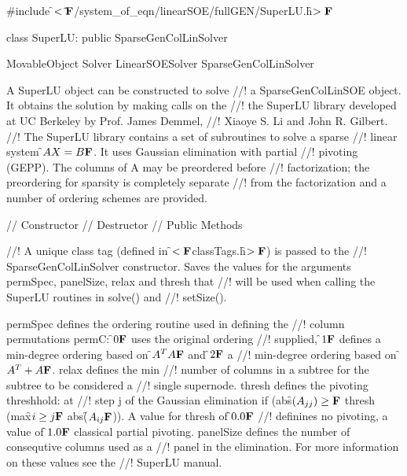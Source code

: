 
\indent \#include \f$<\tilde{
}{\bf F}$/system\_of\_eqn/linearSOE/fullGEN/SuperLU.h\f$>{\bf F}$ 

\indent class SuperLU: public SparseGenColLinSolver

\indent  MovableObject
\indent\indent  Solver
\indent\indent\indent LinearSOESolver
\indent\indent\indent\indent  SparseGenColLinSolver
\indent\indent\indent\indent{}

\indent A SuperLU object can be constructed to solve
//! a SparseGenColLinSOE object. It obtains the solution by making calls on the
//! the SuperLU library developed at UC Berkeley by Prof. James Demmel, 
//! Xiaoye S. Li and John R. Gilbert.
//! The SuperLU library contains a set of subroutines to solve a sparse
//! linear system  \f$AX=B{\bf F}$. It uses Gaussian elimination with partial
//! pivoting (GEPP). The columns of A may be preordered before
//! factorization; the preordering for sparsity is completely separate
//! from the factorization and a number of ordering schemes are provided.

\indent // Constructor
\indent // Destructor
\indent // Public Methods

//! A unique class tag (defined in \f$<{\bf F}$classTags.h\f$>{\bf F}$) is passed to the
//! SparseGenColLinSolver constructor. Saves the values for the arguments
\p permSpec, \p panelSize, \p relax and \p thresh that
//! will be used when calling the SuperLU routines in solve() and
//! setSize().

\p permSpec defines the ordering routine used in defining the
//! column permutations \p permC: \f$0{\bf F}$ uses the original ordering
//! supplied, \f$1{\bf F}$ defines a min-degree ordering based on \f$A^TA{\bf F}$ and \f$2{\bf F}$ a
//! min-degree ordering based on \f$A^T + A{\bf F}$. \p relax defines the min
//! number of columns in a subtree for the subtree to be considered a
//! single supernode. \p thresh defines the pivoting threshhold: at
//! step j of the Gaussian elimination if (abs\f$(A_{jj}) \ge{\bf F}$ \p thresh
(max\f$ i \ge j{\bf F}$ abs(\f$A_{ij}{\bf F}$)). A value for \p thresh of \f$0.0{\bf F}$
//! definines no pivoting, a value of \f$1.0{\bf F}$ classical partial pivoting.
\p panelSize defines the number of consequtive columns used as a
//! panel in the elimination. For more information on these values see the
//! SuperLU manual.


